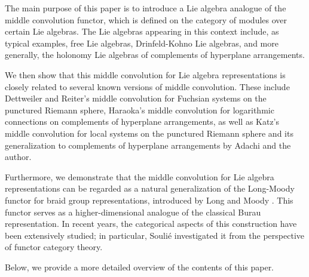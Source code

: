 \documentclass[a4paper,12pt]{article}
\theoremstyle{definition}
\theoremstyle{remark}
\begin{document}
The main purpose of this paper is to introduce a Lie algebra analogue of 
the middle convolution functor, which is defined on the category of 
modules over certain Lie algebras. 
The Lie algebras appearing in this context include, 
as typical examples, free Lie algebras, Drinfeld-Kohno Lie algebras, 
and more generally, the holonomy Lie algebras of complements 
of hyperplane arrangements.

We then show that this middle convolution for Lie algebra representations 
is closely related to several known versions of middle convolution. 
These include Dettweiler and Reiter's middle convolution for Fuchsian systems 
on the punctured Riemann sphere, Haraoka's middle convolution for logarithmic 
connections on complements of hyperplane arrangements, 
as well as Katz's middle convolution for local systems on the punctured Riemann 
sphere and its generalization to complements of hyperplane arrangements 
by Adachi and the author.

Furthermore, we demonstrate that the middle convolution for Lie algebra 
representations can be regarded as a natural generalization of the Long-Moody 
functor for braid group representations, 
introduced by Long and Moody \cite{Lo94}. 
This functor serves as a higher-dimensional analogue of the classical 
Burau representation. 
In recent years, the categorical aspects of this construction 
have been extensively studied; 
in particular, Souli\'e \cite{Sou19} investigated it 
from the perspective of functor category theory.

Below, we provide a more detailed overview of the contents of this paper.
\end{document}
